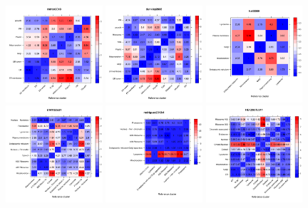 \documentclass[12pt]{article}\usepackage[]{graphicx}\usepackage[]{color}
\begin{document}
\begin{appendices}
\begin{figure}[htb]
  \includegraphics[width = 0.32\textwidth]{./figure/allhmaps-16.pdf}
  \includegraphics[width = 0.32\textwidth]{./figure/allhmaps-17.pdf}
  \includegraphics[width = 0.32\textwidth]{./figure/allhmaps-18.pdf}
  \includegraphics[width = 0.32\textwidth]{./figure/allhmaps-19.pdf}
  \includegraphics[width = 0.32\textwidth]{./figure/allhmaps-20.pdf}
  \includegraphics[width = 0.32\textwidth]{./figure/allhmaps-21.pdf}

\end{figure}
\end{appendices}
\end{document}
